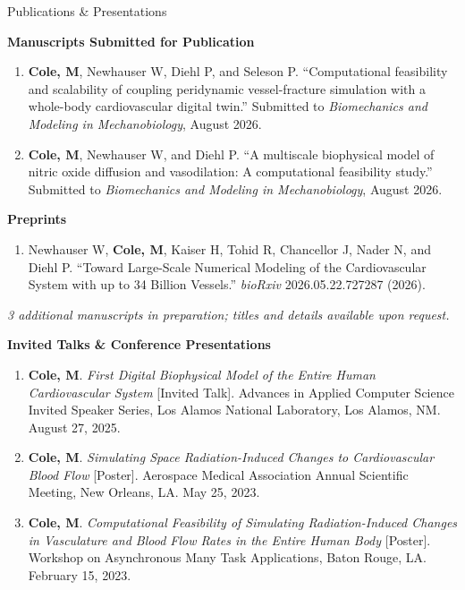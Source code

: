 \documentclass[
	11pt, %
]{resume} %
\begin{document}
\begin{rSection}{Publications \& Presentations}

	\textbf{Manuscripts Submitted for Publication}
	\begin{enumerate}
		\itemsep-0.3em
		\item \textbf{Cole, M}, Newhauser W, Diehl P, and Seleson P. ``Computational feasibility and scalability of coupling peridynamic vessel-fracture simulation with a whole-body cardiovascular digital twin.'' Submitted to \textit{Biomechanics and Modeling in Mechanobiology}, August 2026.
		\item \textbf{Cole, M}, Newhauser W, and Diehl P. ``A multiscale biophysical model of nitric oxide diffusion and vasodilation: A computational feasibility study.'' Submitted to \textit{Biomechanics and Modeling in Mechanobiology}, August 2026.
	\end{enumerate}

	\textbf{Preprints}
	\begin{enumerate}
		\itemsep-0.3em
		\item Newhauser W, \textbf{Cole, M}, Kaiser H, Tohid R, Chancellor J, Nader N, and Diehl P. ``Toward Large-Scale Numerical Modeling of the Cardiovascular System with up to 34 Billion Vessels.'' \textit{bioRxiv} 2026.05.22.727287 (2026).
	\end{enumerate}

	\textit{3 additional manuscripts in preparation; titles and details available upon request.}

	\textbf{Invited Talks \& Conference Presentations}
	\begin{enumerate}
		\itemsep-0.3em
		\item \textbf{Cole, M}. \textit{First Digital Biophysical Model of the Entire Human Cardiovascular System} [Invited Talk]. Advances in Applied Computer Science Invited Speaker Series, Los Alamos National Laboratory, Los Alamos, NM. August 27, 2025.
		\item \textbf{Cole, M}. \textit{Simulating Space Radiation-Induced Changes to Cardiovascular Blood Flow} [Poster]. Aerospace Medical Association Annual Scientific Meeting, New Orleans, LA. May 25, 2023.
		\item \textbf{Cole, M}. \textit{Computational Feasibility of Simulating Radiation-Induced Changes in Vasculature and Blood Flow Rates in the Entire Human Body} [Poster]. Workshop on Asynchronous Many Task Applications, Baton Rouge, LA. February 15, 2023.
	\end{enumerate}

\end{rSection}
\vspace{0.5cm}
\end{document}
